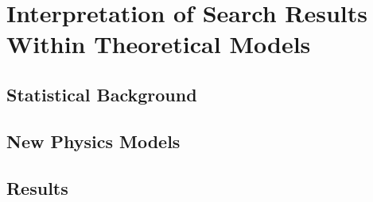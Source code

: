 \chapter{Interpretation of Search Results Within Theoretical Models}
\section{Statistical Background}
\section{New Physics Models}
\section{Results}